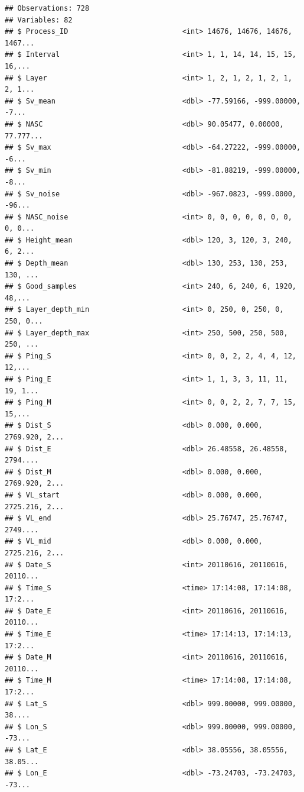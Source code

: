 \documentclass[]{article}
\begin{document}
\begin{verbatim}
## Observations: 728
## Variables: 82
## $ Process_ID                           <int> 14676, 14676, 14676, 1467...
## $ Interval                             <int> 1, 1, 14, 14, 15, 15, 16,...
## $ Layer                                <int> 1, 2, 1, 2, 1, 2, 1, 2, 1...
## $ Sv_mean                              <dbl> -77.59166, -999.00000, -7...
## $ NASC                                 <dbl> 90.05477, 0.00000, 77.777...
## $ Sv_max                               <dbl> -64.27222, -999.00000, -6...
## $ Sv_min                               <dbl> -81.88219, -999.00000, -8...
## $ Sv_noise                             <dbl> -967.0823, -999.0000, -96...
## $ NASC_noise                           <int> 0, 0, 0, 0, 0, 0, 0, 0, 0...
## $ Height_mean                          <dbl> 120, 3, 120, 3, 240, 6, 2...
## $ Depth_mean                           <dbl> 130, 253, 130, 253, 130, ...
## $ Good_samples                         <int> 240, 6, 240, 6, 1920, 48,...
## $ Layer_depth_min                      <int> 0, 250, 0, 250, 0, 250, 0...
## $ Layer_depth_max                      <int> 250, 500, 250, 500, 250, ...
## $ Ping_S                               <int> 0, 0, 2, 2, 4, 4, 12, 12,...
## $ Ping_E                               <int> 1, 1, 3, 3, 11, 11, 19, 1...
## $ Ping_M                               <int> 0, 0, 2, 2, 7, 7, 15, 15,...
## $ Dist_S                               <dbl> 0.000, 0.000, 2769.920, 2...
## $ Dist_E                               <dbl> 26.48558, 26.48558, 2794....
## $ Dist_M                               <dbl> 0.000, 0.000, 2769.920, 2...
## $ VL_start                             <dbl> 0.000, 0.000, 2725.216, 2...
## $ VL_end                               <dbl> 25.76747, 25.76747, 2749....
## $ VL_mid                               <dbl> 0.000, 0.000, 2725.216, 2...
## $ Date_S                               <int> 20110616, 20110616, 20110...
## $ Time_S                               <time> 17:14:08, 17:14:08, 17:2...
## $ Date_E                               <int> 20110616, 20110616, 20110...
## $ Time_E                               <time> 17:14:13, 17:14:13, 17:2...
## $ Date_M                               <int> 20110616, 20110616, 20110...
## $ Time_M                               <time> 17:14:08, 17:14:08, 17:2...
## $ Lat_S                                <dbl> 999.00000, 999.00000, 38....
## $ Lon_S                                <dbl> 999.00000, 999.00000, -73...
## $ Lat_E                                <dbl> 38.05556, 38.05556, 38.05...
## $ Lon_E                                <dbl> -73.24703, -73.24703, -73...

\end{verbatim}
\end{document}
